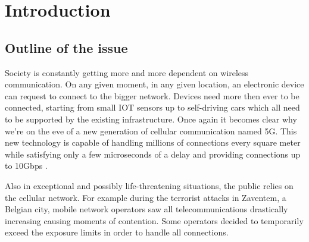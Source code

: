 %

\chapter{Introduction}
\label{chap:intro}

\section{Outline of the issue} %
\label{sec:issue}

Society is constantly getting more and more dependent on wireless communication. On any given moment, in any given location, an electronic device
can request to connect to the bigger network. Devices need more then ever to be connected, starting from small IOT sensors up to self-driving cars
which all need to be supported by the existing infrastructure. Once again it becomes clear why we're on the eve of a new generation of cellular communication named 5G. 
This new technology is capable of handling millions of connections every square meter %
while satisfying only a few microseconds of a delay and providing connections up to 10Gbps \cite{5GFeatures}.

Also in exceptional and possibly life-threatening situations, the public relies on the cellular network. For example during the terrorist attacks in Zaventem, a Belgian city,
mobile network operators saw all telecommunications drastically increasing causing moments of contention. Some operators decided to temporarily exceed the exposure limits in
order to handle all connections. \cite{baseZaventem}

